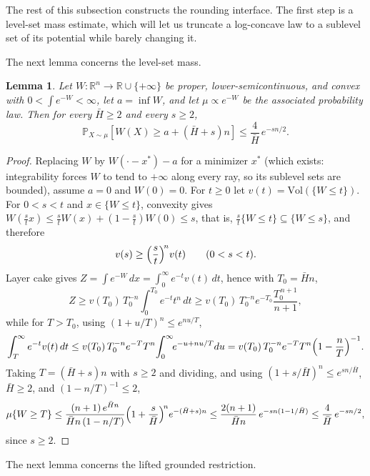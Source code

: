 \documentclass[11pt]{article}
\numberwithin{equation}{section}
\newtheorem{lemma}{Lemma}[section]
\theoremstyle{definition}
\newcommand{\R}{\mathbb{R}}
\newcommand{\Vol}{\mathrm{Vol}}
\renewcommand{\P}[2]{\mathbb{P}_{#1}\left[#2\right]}
\begin{document}
The rest of this subsection constructs the rounding interface.
The first step is a level-set mass estimate, which will let us truncate a
log-concave law to a sublevel set of its potential while barely changing it.

The next lemma concerns the level-set mass.

\begin{lemma}
\label{lem:level-mass}
Let $W:\R^n\to\R\cup\{+\infty\}$ be proper, lower-semicontinuous, and convex
with
$0<\int e^{-W}<\infty$, let
$a=\inf W$, and let
$\mu\propto e^{-W}$ be the associated probability law.
Then for every $\bar H\geq2$ and every
$s\geq2$,
\[
 \P{X\sim\mu}{W(X)\geq a+(\bar H+s)n}\leq\frac{4}{\bar H}\,e^{-sn/2}.
\]
\end{lemma}

\begin{proof}
Replacing $W$ by
$W(\cdot-x^*)-a$ for a minimizer
$x^*$ (which exists: integrability forces
$W$ to tend to
$+\infty$ along every ray, so its sublevel sets are bounded), assume
$a=0$ and
$W(0)=0$.
For $t\geq0$ let
$v(t)=\Vol(\{W\leq t\})$.
For $0<s<t$ and
$x\in\{W\leq t\}$, convexity gives
$W(\frac stx)\leq\frac stW(x)+(1-\frac st)W(0) \leq s$, that is,
$\frac st\{W\leq t\}\subseteq\{W\leq s\}$, and therefore
\[
 v(s)\geq\Bigl(\frac st\Bigr)^{\!n}v(t)
 \qquad(0<s<t).
\]
Layer cake gives $Z=\int e^{-W}\,dx=\int_0^\infty e^{-t}v(t)\,dt$, hence with
$T_0=\bar Hn$,
\[
Z
\geq v(T_0)\,T_0^{-n}\!\!\int_0^{T_0}\!\!e^{-t}t^n\,dt
\geq v(T_0)\,T_0^{-n}e^{-T_0}\frac{T_0^{\,n+1}}{n+1},
\]
while for $T>T_0$, using
$(1+u/T)^n\leq e^{nu/T}$,
\[
\int_T^\infty e^{-t}v(t)\,dt
\leq v(T_0)\,T_0^{-n}e^{-T}T^n\!\int_0^\infty\!\!e^{-u+nu/T}du
= v(T_0)\,T_0^{-n}e^{-T}T^n\Bigl(1-\frac nT\Bigr)^{-1}.
\]
Taking $T=(\bar H+s)n$ with
$s\geq2$ and dividing, and using
$(1+s/\bar H)^n\leq e^{sn/\bar H}$,
$\bar H\geq2$, and
$(1-n/T)^{-1}\leq2$,
\[
\mu\{W\geq T\}
\leq \frac{(n+1)\,e^{\bar Hn}}{\bar H n\,(1-n/T)} \Bigl(1+\frac{s}{\bar H}\Bigr)^{\!n}e^{-(\bar H+s)n}
\leq \frac{2(n+1)}{\bar H n}\,e^{-sn(1-1/\bar H)}
\leq \frac{4}{\bar H}\,e^{-sn/2},
\]
since $s\geq2$.
\end{proof}

The next lemma concerns the lifted grounded restriction.
\end{document}
